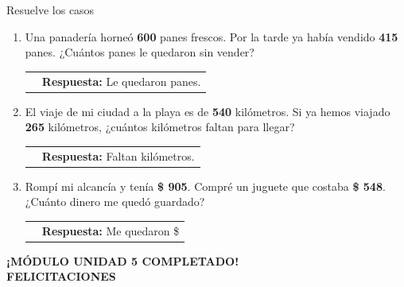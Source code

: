 \documentclass[12pt, letterpaper]{article}
\newcommand{\boxfill}[1][1.2cm]{\tcbox[on line, size=minimal, colframe=valdark!80, colback=white, boxrule=0.5pt, arc=1mm, boxsep=2pt, left=2pt, right=2pt, top=2pt, bottom=2pt]{\makebox[#1]{\vphantom{M}}}}
\begin{document}
\begin{practica}{Resuelve los casos }
\begin{enumerate}[itemsep=1.5cm]
			\item Una panadería horneó \textbf{600} panes frescos. Por la tarde ya había vendido \textbf{415} panes. ¿Cuántos panes le quedaron sin vender? \\
			\begin{tabular}{c c}
				\makebox[5cm]{ \boxfill[3cm] } & \textbf{Respuesta:} Le quedaron \boxfill[1.5cm] panes.
			\end{tabular}
			
			\item El viaje de mi ciudad a la playa es de \textbf{540} kilómetros. Si ya hemos viajado \textbf{265} kilómetros, ¿cuántos kilómetros faltan para llegar? \\
			\begin{tabular}{c c}
				\makebox[5cm]{ \boxfill[3cm] } & \textbf{Respuesta:} Faltan \boxfill[1.5cm] kilómetros.
			\end{tabular}
			
			\item Rompí mi alcancía y tenía \textbf{\$ 905}. Compré un juguete que costaba \textbf{\$ 548}. ¿Cuánto dinero me quedó guardado? \\
			\begin{tabular}{c c}
				\makebox[5cm]{ \boxfill[3cm] } & \textbf{Respuesta:} Me quedaron \$ \boxfill[1.5cm]
			\end{tabular}
		\end{enumerate}
		\vspace{0.2cm}
	\end{practica}
	
	\vspace{1cm}
	\begin{center}
		\begin{tcolorbox}[colback=valblue!10, colframe=valblue, width=14cm, arc=3mm, boxrule=1.5pt]
			\centering \Large \textbf{¡MÓDULO UNIDAD 5 COMPLETADO!\\
			FELICITACIONES}\\[0.2cm]
			
		\end{tcolorbox}
	\end{center}
	
\end{document}

